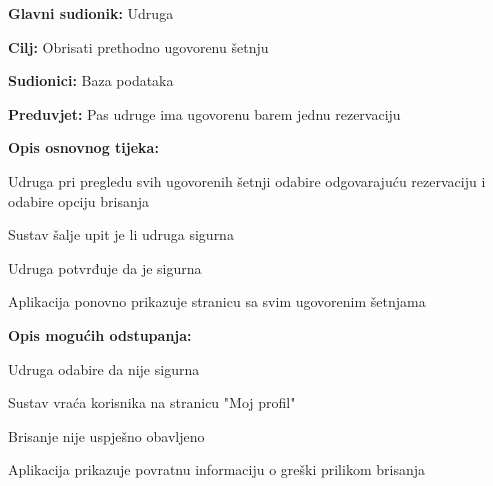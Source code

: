 					\noindent {}
					\begin{packed_item}
	
						\item \textbf{Glavni sudionik:} Udruga
						\item  \textbf{Cilj:} Obrisati prethodno ugovorenu šetnju
						\item  \textbf{Sudionici:} Baza podataka
						\item  \textbf{Preduvjet:} Pas udruge ima ugovorenu barem jednu rezervaciju 
						\item  \textbf{Opis osnovnog tijeka:}
						
						\item[] \begin{packed_enum}
							\item Udruga pri pregledu svih ugovorenih šetnji odabire odgovarajuću rezervaciju i odabire opciju brisanja
							\item Sustav šalje upit je li udruga sigurna
							\item Udruga potvrđuje da je sigurna
							\item Aplikacija ponovno prikazuje stranicu sa svim ugovorenim šetnjama
						
						\end{packed_enum}
						\item  \textbf{Opis mogućih odstupanja:}
						
						\item[] \begin{packed_item}
							\item[3.a] Udruga odabire da nije sigurna
							\item[] \begin{packed_enum}
								\item Sustav vraća korisnika na stranicu "Moj profil"
							\end{packed_enum}
	                        \item[4.a] Brisanje nije uspješno obavljeno
	                        \item[] \begin{packed_enum}
								\item Aplikacija prikazuje povratnu informaciju o greški prilikom brisanja
							\end{packed_enum}
						\end{packed_item}
					\end{packed_item}
					
